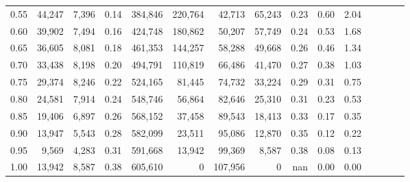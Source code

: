 \begin{tabular}{rrrcrrrrrrrrrrr}
0.55 &  44,247 &  7,396 &                                       0.14 &  384,846 &  220,764 &   42,713 &   65,243 &  0.23 &  0.60 &                         2.04 \\
0.60 &  39,902 &  7,494 &                                       0.16 &  424,748 &  180,862 &   50,207 &   57,749 &  0.24 &  0.53 &                         1.68 \\
0.65 &  36,605 &  8,081 &                                       0.18 &  461,353 &  144,257 &   58,288 &   49,668 &  0.26 &  0.46 &                         1.34 \\
0.70 &  33,438 &  8,198 &                                       0.20 &  494,791 &  110,819 &   66,486 &   41,470 &  0.27 &  0.38 &                         1.03 \\
0.75 &  29,374 &  8,246 &                                       0.22 &  524,165 &   81,445 &   74,732 &   33,224 &  0.29 &  0.31 &                         0.75 \\
0.80 &  24,581 &  7,914 &                                       0.24 &  548,746 &   56,864 &   82,646 &   25,310 &  0.31 &  0.23 &                         0.53 \\
0.85 &  19,406 &  6,897 &                                       0.26 &  568,152 &   37,458 &   89,543 &   18,413 &  0.33 &  0.17 &                         0.35 \\
0.90 &  13,947 &  5,543 &                                       0.28 &  582,099 &   23,511 &   95,086 &   12,870 &  0.35 &  0.12 &                         0.22 \\
0.95 &   9,569 &  4,283 &                                       0.31 &  591,668 &   13,942 &   99,369 &    8,587 &  0.38 &  0.08 &                         0.13 \\
1.00 &  13,942 &  8,587 &                                       0.38 &  605,610 &        0 &  107,956 &        0 &   nan &  0.00 &                         0.00 \\
\bottomrule
\end{tabular}
